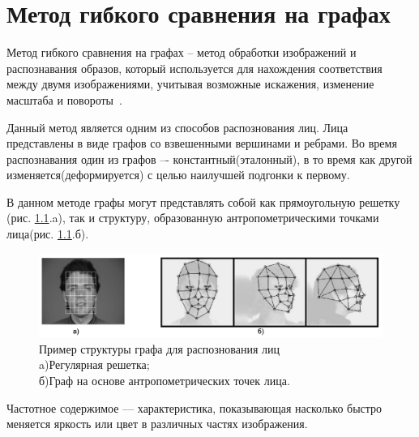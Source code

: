 \chapter{Метод гибкого сравнения на графах}

Метод гибкого сравнения на графах -- метод обработки изображений и распознавания образов, который 
используется для нахождения соответствия между двумя изображениями, учитывая возможные искажения, изменение масштаба и повороты~\cite{distances}.

Данный метод является одним из способов распознования лиц.
Лица представлены в виде графов со взвешенными
вершинами и ребрами\cite{wen}. 
Во время распознавания один из графов –- константный(эталонный), 
в то время как другой изменяется(деформируется) с 
целью наилучшей подгонки к первому. 

В данном методе графы могут представлять собой как 
прямоугольную решетку (рис. \ref{img:ant}.a), так и структуру, образованную антропометрическими
точками лица(рис. \ref{img:ant}.б).

\begin{figure}[h]
    \centering
    \includegraphics[height=0.15\textheight]{img/ex.jpg}
    \caption{Пример структуры графа для распознования лиц \\ 
    a)Регулярная решетка; \\ б)Граф на основе антропометрических точек лица.}
    \label{img:ant}
\end{figure}

Частотное содержимое --- характеристика, показывающая насколько быстро 
меняется яркость или цвет в различных частях изображения.

